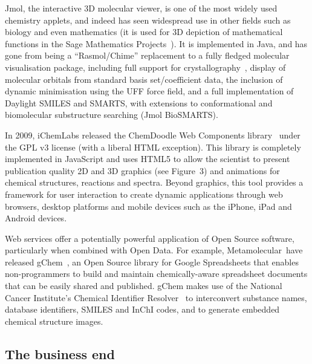 \documentclass[10pt]{bmc_article}
\newenvironment{bmcformat}{\fussy\setboolean{publ}{true}}{\fussy}
\begin{document}
\begin{bmcformat}
Jmol, the interactive 3D molecular viewer, is one of the most widely used
chemistry applets, and indeed has
seen widespread use in other fields such as biology and 
even mathematics (it is used for 3D depiction of mathematical
functions in the Sage Mathematics Projects~\cite{WebSage}). It is implemented
in Java, and has gone from being a ``Rasmol/Chime'' replacement to a fully fledged molecular
visualisation package, including full support for crystallography~\cite{Hanson2010},
display of molecular orbitals from standard basis set/coefficient data,
the inclusion of dynamic minimisation using the UFF force field, and
a full implementation of Daylight SMILES and SMARTS, with extensions to
conformational and biomolecular substructure searching (Jmol
BioSMARTS).

In 2009, iChemLabs released the ChemDoodle Web Components
library~\cite{ChemDoodleWeb} under the GPL v3 license (with a
liberal HTML exception). This library is completely implemented in JavaScript
and uses HTML5 to allow the scientist
to present publication quality 2D and 3D graphics (see Figure~3) and animations for
chemical structures, reactions and spectra. Beyond graphics, this tool
provides a framework for user interaction to create dynamic
applications through web browsers, desktop platforms and mobile
devices such as the iPhone, iPad and Android devices.

Web services offer a potentially powerful application of Open Source software,
particularly when combined with Open Data. For example, Metamolecular~\cite{Metamolecular}have released
gChem~\cite{gChem}, an Open Source library for Google Spreadsheets that enables
non-programmers to build and maintain chemically-aware spreadsheet documents
that can be easily shared and published. gChem makes use of the National Cancer Institute's
Chemical Identifier Resolver~\cite{ChemicalIdentifierResolver} to interconvert
substance names, database identifiers, SMILES and InChI codes, and to generate
embedded chemical structure images.

\subsection*{The business end}



\end{bmcformat}
\end{document}
